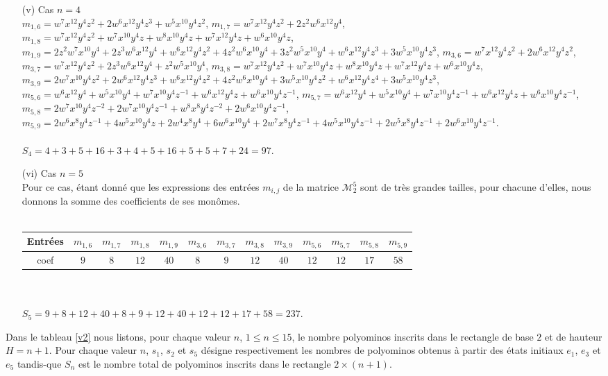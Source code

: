 \begin{itemize}
\item[(v)] Cas $n=4$\\

$m_{1,6}=w^7x^{12}y^4z^{2}+2w^6x^{12}y^4z^{3}+w^5x^{10}y^4z^{2}$, $m_{1,7}=w^7x^{12}y^4z^{2}+2z^2w^6x^{12}y^4$, $m_{1,8}=w^7x^{12}y^4z^2+w^7x^{10}y^4z+w^8x^{10}y^4z+w^7x^{12}y^4z+w^6x^{10}y^4z$, $m_{1,9}=2z^2w^7x^{10}y^4+2z^3w^6x^{12}y^4+w^6x^{12}y^4z^{2}+4z^2w^6x^{10}y^4+3z^2w^5x^{10}y^4+w^6x^{12}y^4z^{3}+3w^5x^{10}y^4z^{3}$,  $m_{3,6}=w^7x^{12}y^4z^{2}+2w^6x^{12}y^4z^{2}$, $m_{3,7}=w^7x^{12}y^4z^{2}+2z^3w^6x^{12}y^4+z^2w^5x^{10}y^4$, $m_{3,8}=w^7x^{12}y^4z^{2}+w^7x^{10}y^4z+w^8x^{10}y^4z+w^7x^{12}y^4z+w^6x^{10}y^4z$, $m_{3,9}=2w^7x^{10}y^4z^{2}+2w^6x^{12}y^4z^{3}+w^6x^{12}y^4z^{2}+4z^2w^6x^{10}y^4+3w^5x^{10}y^4z^{2}+w^6x^{12}y^4z^{4}+3w^5x^{10}y^4z^{3}$, $m_{5,6}=w^6x^{12}y^4+w^5x^{10}y^4+w^7x^{10}y^4z^{-1}+w^6x^{12}y^4z+w^6x^{10}y^4z^{-1}$, $m_{5,7}=w^6x^{12}y^4+w^5x^{10}y^4+w^7x^{10}y^4z^{-1}+w^6x^{12}y^4z+w^6x^{10}y^4z^{-1}$,  $m_{5,8}=
2w^7x^{10}y^4z^{-2}+2w^7x^{10}y^4z^{-1}+w^8x^8y^4z^{-2}+2w^6x^{10}y^4z^{-1}$, $m_{5,9}= 2w^6x^8y^4z^{-1}+4w^5x^{10}y^4z+2w^4x^8y^4+6w^6x^{10}y^4+2w^7x^8y^4z^{-1}+4w^5x^{10}y^4z^{-1}+2w^5x^8y^4z^{-1}+2w^6x^{10}y^4z^{-1}$.
\mbox{ }\\\\
$S_{4}=4+3+5+16+3+4+5+16+5+5+7+24=97$.
\item[(vi)] Cas $n=5$\\

Pour ce cas, étant donné que les expressions des entrées $m_{i,j}$ de la matrice $\mathcal{M}_{2}^{5}$ sont de très grandes tailles, pour chacune d'elles, nous donnons la somme des coefficients  de ses monômes.\\\\
 \tiny
\begin{tabular}{|c|c|c|c|c|c|c|c|c|c|c|c|c|}
 \hline
Entrées & $m_{1,6}$& $m_{1,7}$&$m_{1,8}$ & $m_{1,9}$& $m_{3,6}$ &$m_{3,7}$ & $m_{3,8}$&$m_{3,9}$ & $m_{5,6}$& $m_{5,7}$ &$m_{5,8}$ &$m_{5,9}$ \\
 \hline
 coef  &$9$ &$8$&$12$ &$40$  &$8$ &$9$ &$12$  &$40$&$12$ &$12$  &$17$&$58$ \\
 \hline
 \end{tabular}
 \normalsize
\mbox{ }\\\\
$S_{5}=9+8+12+40+8+9+12+40+12+12+17+58=237$.
\end{itemize}
Dans le tableau \ref{v2} nous listons, pour chaque valeur $n$, $1\leq n\leq 15$, le nombre  polyominos inscrits dans le rectangle de base $2$ et de hauteur $H=n+1$. Pour chaque valeur $n$, $s_{1}$, $s_{2}$ et $s_{5}$ désigne respectivement les nombres de polyominos obtenus à partir des états initiaux $e_{1}$, $e_{3}$ et $e_{5}$ tandis-que $S_{n}$ est le nombre total de polyominos inscrits dans le rectangle $2\times (n+1)$.
